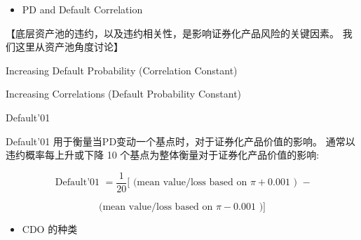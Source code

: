 \begin{itemize}
\item PD and Default Correlation
\end{itemize}

 【底层资产池的违约，以及违约相关性，是影响证券化产品风险的关键因素。 我们这里从资产池角度讨论】

Increasing Default Probability (Correlation Constant)

\begin{center}
\end{center}

Increasing Correlations (Default Probability Constant)

\begin{center}
\end{center}

Default'01

 Default'01 用于衡量当PD变动一个基点时，对于证券化产品价值的影响。 通常以违约概率每上升或下降 10 个基点为整体衡量对于证券化产品价值的影响:

\[
\text{ Default’01 } = \frac{1}{20}\lbrack \text{ (mean value/loss based on }\pi  + {0.001}\text{ ) } -
\]

\[
\text{ (mean value/loss based on }\pi  - {0.001}\text{ )] }
\]

\begin{itemize}
\item CDO 的种类
\end{itemize}

